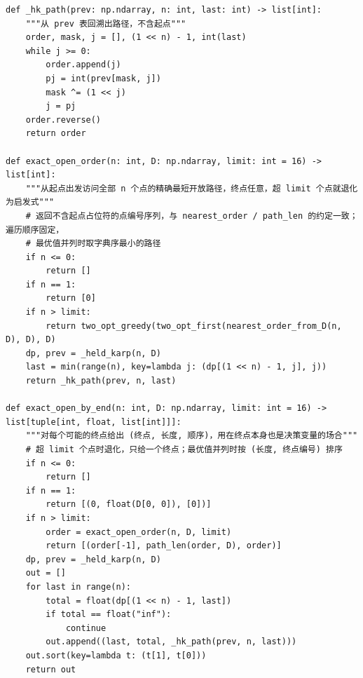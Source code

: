 \documentclass[UTF8, zihao=5,AutoFakeBold=2]{ctexart}
\begin{document}
\begin{lstlisting}
def _hk_path(prev: np.ndarray, n: int, last: int) -> list[int]:
    """从 prev 表回溯出路径，不含起点"""
    order, mask, j = [], (1 << n) - 1, int(last)
    while j >= 0:
        order.append(j)
        pj = int(prev[mask, j])
        mask ^= (1 << j)
        j = pj
    order.reverse()
    return order

def exact_open_order(n: int, D: np.ndarray, limit: int = 16) -> list[int]:
    """从起点出发访问全部 n 个点的精确最短开放路径，终点任意，超 limit 个点就退化为启发式"""
    # 返回不含起点占位符的点编号序列，与 nearest_order / path_len 的约定一致；遍历顺序固定，
    # 最优值并列时取字典序最小的路径
    if n <= 0:
        return []
    if n == 1:
        return [0]
    if n > limit:
        return two_opt_greedy(two_opt_first(nearest_order_from_D(n, D), D), D)
    dp, prev = _held_karp(n, D)
    last = min(range(n), key=lambda j: (dp[(1 << n) - 1, j], j))
    return _hk_path(prev, n, last)

def exact_open_by_end(n: int, D: np.ndarray, limit: int = 16) -> list[tuple[int, float, list[int]]]:
    """对每个可能的终点给出 (终点, 长度, 顺序)，用在终点本身也是决策变量的场合"""
    # 超 limit 个点时退化，只给一个终点；最优值并列时按 (长度, 终点编号) 排序
    if n <= 0:
        return []
    if n == 1:
        return [(0, float(D[0, 0]), [0])]
    if n > limit:
        order = exact_open_order(n, D, limit)
        return [(order[-1], path_len(order, D), order)]
    dp, prev = _held_karp(n, D)
    out = []
    for last in range(n):
        total = float(dp[(1 << n) - 1, last])
        if total == float("inf"):
            continue
        out.append((last, total, _hk_path(prev, n, last)))
    out.sort(key=lambda t: (t[1], t[0]))
    return out
	\end{lstlisting}
\end{document}
